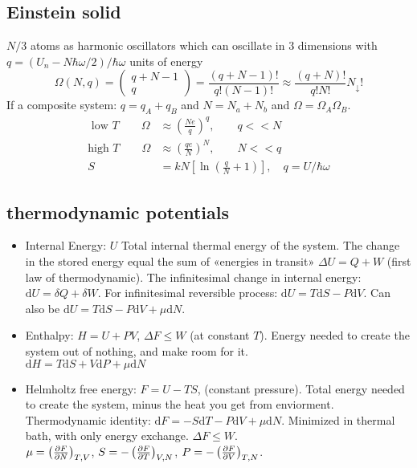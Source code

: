\documentclass[a4paper, norsk, 8pt]{article}
\begin{document}
\begin{multicols*}{3}
\subsection*{\footnotesize  Einstein solid}
$N/3$ atoms as harmonic oscillators which can oscillate in $3$ dimensions with $q=(U_n-N\hbar\omega/2)/\hbar\omega$ units of energy
\begin{equation*}
  \Omega(N, q) = \begin{pmatrix} q+N-1 \\ q \end{pmatrix} = \frac{(q+N-1)!}{q! (N-1)!} \approx  \frac{(q+N)!}{q! N!} N_{\downarrow}!
\end{equation*}
If a composite system: $q=q_A+q_B$ and $N=N_a+N_b$ and $\Omega = \Omega_A\Omega_B$.
\begin{align*}
  \text{ low $T$}\qquad \Omega &\approx \left(\frac{Ne}{q} \right)^q,  \qquad q << N\\
  \text{high $T$}\qquad \Omega &\approx \left(\frac{qe}{N} \right)^N,  \qquad N << q \\
  S &= kN\left[ \ln{\left( \frac{q}{N} + 1\right)} \right],\quad q = U/\hbar\omega
\end{align*}

\subsection*{\footnotesize  thermodynamic potentials}

\begin{itemize}
    \item Internal Energy: $U$    Total internal thermal energy of the system. The change in the stored energy equal the sum of «energies in transit»  $\Delta U = Q + W$ (first law of thermodynamic). The infinitesimal change in internal energy: $\mbox{d}U = \delta Q + \delta W$. For infinitesimal reversible process: $\mbox{d}U = T\mbox{d}S - P \mbox{d}V$.
    Can also be $\mbox{d}U = T\mbox{d}S -P\mbox{d}V + \mu\mbox{d}N$.\\

    \item Enthalpy: $H=U+PV$,  $\Delta F \leq W$ (at constant $T$). Energy needed to create the system out of nothing, and make room for it. \\$\mbox{d}H = T\mbox{d}S + V\mbox{d}P +\mu \mbox{d}N$

    \item Helmholtz free energy: $F=U-TS$, (constant pressure). Total energy needed to create the system, minus the heat you get from enviorment. Thermodynamic identity: $\mbox{d}F=-S\mbox{d}T-P\mbox{d}V+\mu\mbox{d}N$. Minimized in thermal bath, with only energy exchange. $\Delta F \leq W$. \\ $\mu=\left( \pdv{F}{N} \right)_{T,V}$, $S=-\left( \pdv{F}{T} \right)_{V, N}$, $P=-\left(\pdv{F}{V}\right)_{T,N}$.


\end{itemize}
\end{multicols*}
\end{document}
